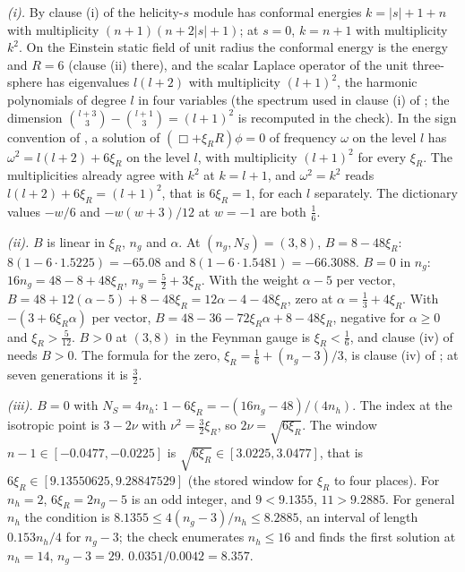 \emph{(i).} By clause (i) of  the helicity-$s$ module has conformal energies $k = |s| + 1 + n$ with multiplicity $(n + 1)(n + 2|s| + 1)$; at $s = 0$, $k = n + 1$ with multiplicity $k^{2}$. On the Einstein static field of unit radius the conformal energy is the energy and $R = 6$ (clause (ii) there), and the scalar Laplace operator of the unit three-sphere has eigenvalues $l(l + 2)$ with multiplicity $(l + 1)^{2}$, the harmonic polynomials of degree $l$ in four variables (the spectrum used in clause (i) of ; the dimension $\binom{l+3}{3} - \binom{l+1}{3} = (l+1)^{2}$ is recomputed in the check). In the sign convention of , a solution of $(\Box + \xi_{R}R)\phi = 0$ of frequency $\omega$ on the level $l$ has $\omega^{2} = l(l + 2) + 6\xi_{R}$ on the level $l$, with multiplicity $(l + 1)^{2}$ for every $\xi_{R}$. The multiplicities already agree with $k^{2}$ at $k = l + 1$, and $\omega^{2} = k^{2}$ reads $l(l + 2) + 6\xi_{R} = (l + 1)^{2}$, that is $6\xi_{R} = 1$, for each $l$ separately. The dictionary values $-w/6$ and $-w(w + 3)/12$ at $w = -1$ are both $\tfrac16$.

\emph{(ii).} $B$ is linear in $\xi_{R}$, $n_{g}$ and $\alpha$. At $(n_{g}, N_{S}) = (3, 8)$, $B = 8 - 48\xi_{R}$: $8(1 - 6\cdot1.5225) = -65.08$ and $8(1 - 6\cdot1.5481) = -66.3088$. $B = 0$ in $n_{g}$: $16n_{g} = 48 - 8 + 48\xi_{R}$, $n_{g} = \tfrac52 + 3\xi_{R}$. With the weight $\alpha - 5$ per vector, $B = 48 + 12(\alpha - 5) + 8 - 48\xi_{R} = 12\alpha - 4 - 48\xi_{R}$, zero at $\alpha = \tfrac13 + 4\xi_{R}$. With $-(3 + 6\xi_{R}\alpha)$ per vector, $B = 48 - 36 - 72\xi_{R}\alpha + 8 - 48\xi_{R}$, negative for $\alpha \ge 0$ and $\xi_{R} > \tfrac{5}{12}$. $B > 0$ at $(3, 8)$ in the Feynman gauge is $\xi_{R} < \tfrac16$, and clause (iv) of  needs $B > 0$. The formula for the zero, $\xi_{R} = \tfrac16 + (n_{g} - 3)/3$, is clause (iv) of ; at seven generations it is $\tfrac32$.

\emph{(iii).} $B = 0$ with $N_{S} = 4n_{h}$: $1 - 6\xi_{R} = -(16n_{g} - 48)/(4n_{h})$. The index at the isotropic point is $3 - 2\nu$ with $\nu^{2} = \tfrac32\xi_{R}$, so $2\nu = \sqrt{6\xi_{R}}$. The window $n - 1 \in [-0.0477, -0.0225]$ is $\sqrt{6\xi_{R}} \in [3.0225, 3.0477]$, that is $6\xi_{R} \in [9.13550625, 9.28847529]$ (the stored window for $\xi_{R}$ to four places). For $n_{h} = 2$, $6\xi_{R} = 2n_{g} - 5$ is an odd integer, and $9 < 9.1355$, $11 > 9.2885$. For general $n_{h}$ the condition is $8.1355 \le 4(n_{g} - 3)/n_{h} \le 8.2885$, an interval of length $0.153n_{h}/4$ for $n_{g} - 3$; the check enumerates $n_{h} \le 16$ and finds the first solution at $n_{h} = 14$, $n_{g} - 3 = 29$. $0.0351/0.0042 = 8.357$.

